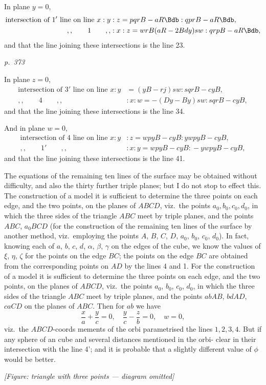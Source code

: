 \documentclass[11pt,a4paper]{book}
\begin{document}
In plane $y = 0$,
\begin{align*}
\text{intersection of } 1' \text{ line on line } x : y &: z = pqr B - aR\Bdb : qprB - aR\Bdb, \\
,, \qquad 1 \qquad ,, &: x : z = wrB(aR - 2Bdy) sw : qrpB - aR\Bdb,
\end{align*}
and that the line joining these intersections is the line 23.

\clearpage

\bigskip
\textit{p.~373}
\smallskip

\noindent
In plane $z = 0$,
\begin{align*}
\text{intersection of } 3' \text{ line on line } x : y &= (yB - rj) sw : sqrB - cyB\dot, \\
,, \qquad 4 \qquad ,, &: x : w = -(D y - B y) sw : sqrB - cyB\dot,
\end{align*}
and that the line joining these intersections is the line 34.

And in plane $w = 0$,
\begin{align*}
\text{intersection of } 4 \text{ line on line } x : y &: z = wp y B - cyB\dot : ywp y B - cyB\dot, \\
,, \qquad 1' \qquad ,, &: x : y = wp y B - cyB\dot : -ywp y B - cyB\dot,
\end{align*}
and that the line joining these intersections is the line 41.

The equations of the remaining ten lines of the surface may be obtained without
difficulty, and also the thirty further triple planes; but I do not stop to effect this.
The construction of a model it is sufficient to determine the three points on each edge,
and the two points, on the planes of $ABCD$, viz.\ the points $a_0, b_0, c_0, d_0$, in which the
three sides of the triangle $ABC$ meet by triple planes, and the points $ABC$, $a_0BCD$
(for the construction of the remaining ten lines of the surface by another method,
viz.\ employing the points $A$, $B$, $C$, $D$, $a_0$, $b_0$, $c_0$, $d_0$).  In fact, knowing
each of $a$, $b$, $c$, $d$, $\alpha$, $\beta$, $\gamma$ on the edges of the cube, we know
the values of $\xi$, $\eta$, $\zeta$ for the points on the edge $BC$; the points on the edge $BC$
are obtained from the corresponding points on $AD$ by the lines 4 and 1.  For
the construction of a model it is sufficient to determine the three points on each
edge, and the two points, on the planes of $ABCD$, viz.\ the points $a_0$, $b_0$, $c_0$, $d_0$, in
which the three sides of the triangle $ABC$ meet by triple planes, and the points
$abAB$, $bdAD$, $caCD$ on the planes of $ABC$.  Then for $ab$ we have
\[
\frac{x}{a} + \frac{y}{c} = 0, \quad \frac{y}{c} - \frac{z}{b} = 0, \quad w = 0,
\]
viz.\ the $ABCD$-coords mements of the orbi parametrised the lines $1, 2, 3, 4$.
But if any sphere of an cube and several distances mentioned in the orbi-
clear in their intersection with the line 4'; and it is probable that a slightly
different value of $\phi$ would be better.
\begin{center}
\textit{[Figure: triangle with three points --- diagram omitted]}
\end{center}
\end{document}

